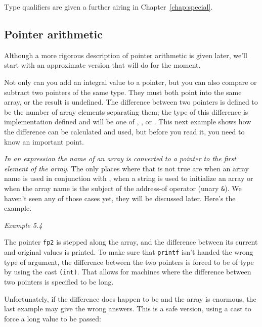    Type qualifiers are given a further airing in Chapter~\ref{chap:special}.


  

  \subsection{Pointer arithmetic}
   

   Although a more rigorous description of pointer arithmetic is given
    later, we'll start with an approximate version that will do for the
    moment.


   Not only can you add an integral value to a pointer, but you can also
    compare or subtract two pointers of the same type. They must both point
    into the same array, or the result is undefined. The difference between
    two pointers is defined to be the number of array elements separating
    them; the type of this difference is implementation defined and will be
    one of \short, \kint, or \klong. This
    next example shows how the difference can be calculated and used, but
    before you read it, you need to know an important point.


   \textit{In an expression the name of an array is converted to a pointer to
    the first element of the array}. The only places where that is not
    true are when an array name is used in conjunction with
    \sizeof, when a string is used to initialize an array or
    when the array name is the subject of the address-of operator (unary
    \texttt{\&}). We haven't seen any of those cases yet, they will
    be discussed later. Here's the example.


    \begin{center}\textit{Example 5.4}\end{center}


   The pointer \texttt{fp2} is stepped along the array, and the
    difference between its current and original values is printed. To make
    sure that \texttt{printf} isn't handed the wrong type of argument,
    the difference between the two pointers is forced to be of type
    \kint{} by using the cast \texttt{(int)}. That allows for
    machines where the difference between two pointers is specified to be
    long.


   Unfortunately, if the difference does happen to be \klong{}
    and the array is enormous, the last example may give the wrong answers.
    This is a safe version, using a cast to force a long value to be
    passed:


